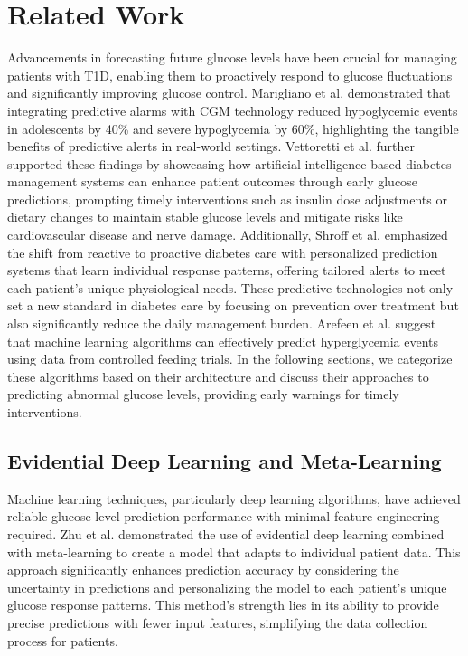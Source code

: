 \section{Related Work}
Advancements in forecasting future glucose levels have been crucial for managing patients with T1D, enabling them to proactively respond to glucose fluctuations and significantly improving glucose control. Marigliano et al. \cite{marigliano2024glucose} demonstrated that integrating predictive alarms with CGM technology reduced hypoglycemic events in adolescents by 40\% and severe hypoglycemia by 60\%, highlighting the tangible benefits of predictive alerts in real-world settings. Vettoretti et al. \cite{vettoretti2020advanced} further supported these findings by showcasing how artificial intelligence-based diabetes management systems can enhance patient outcomes through early glucose predictions, prompting timely interventions such as insulin dose adjustments or dietary changes to maintain stable glucose levels and mitigate risks like cardiovascular disease and nerve damage. Additionally, Shroff et al. \cite{shroff2023glucoseassist} emphasized the shift from reactive to proactive diabetes care with personalized prediction systems that learn individual response patterns, offering tailored alerts to meet each patient's unique physiological needs. These predictive technologies not only set a new standard in diabetes care by focusing on prevention over treatment but also significantly reduce the daily management burden. Arefeen et al. \cite{arefeen2022forewarning} suggest that machine learning algorithms can effectively predict hyperglycemia events using data from controlled feeding trials. In the following sections, we categorize these algorithms based on their architecture and discuss their approaches to predicting abnormal glucose levels, providing early warnings for timely interventions.

\subsection{Evidential Deep Learning and Meta-Learning}
Machine learning techniques, particularly deep learning algorithms, have achieved reliable glucose-level prediction performance with minimal feature engineering required. Zhu et al. \cite{zhu2022personalized} demonstrated the use of evidential deep learning combined with meta-learning to create a model that adapts to individual patient data. This approach significantly enhances prediction accuracy by considering the uncertainty in predictions and personalizing the model to each patient's unique glucose response patterns. This method's strength lies in its ability to provide precise predictions with fewer input features, simplifying the data collection process for patients.


